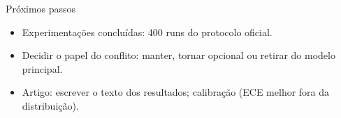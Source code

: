 \documentclass[aspectratio=169,10pt]{beamer}
\begin{document}
\begin{frame}{Próximos passos}
\small
\begin{itemize}
\item Experimentações concluídas: 400 runs do protocolo oficial.
\item Decidir o papel do conflito: manter, tornar opcional ou retirar do modelo principal.
\item Artigo: escrever o texto dos resultados; calibração (ECE melhor fora da distribuição).
\end{itemize}
\end{frame}
\end{document}
